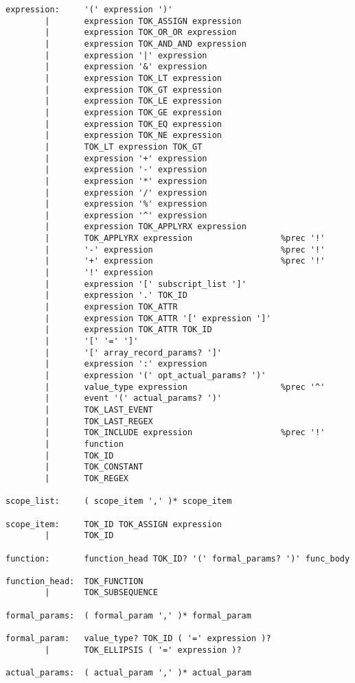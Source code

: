{{\begin{verbatim}
expression:     '(' expression ')'
        |       expression TOK_ASSIGN expression
        |       expression TOK_OR_OR expression
        |       expression TOK_AND_AND expression
        |       expression '|' expression
        |       expression '&' expression
        |       expression TOK_LT expression
        |       expression TOK_GT expression
        |       expression TOK_LE expression
        |       expression TOK_GE expression
        |       expression TOK_EQ expression
        |       expression TOK_NE expression
        |       TOK_LT expression TOK_GT
        |       expression '+' expression
        |       expression '-' expression
        |       expression '*' expression
        |       expression '/' expression
        |       expression '%' expression
        |       expression '^' expression
        |       expression TOK_APPLYRX expression
        |       TOK_APPLYRX expression                  %prec '!'
        |       '-' expression                          %prec '!'
        |       '+' expression                          %prec '!'
        |       '!' expression
        |       expression '[' subscript_list ']'
        |       expression '.' TOK_ID
        |       expression TOK_ATTR
        |       expression TOK_ATTR '[' expression ']'
        |       expression TOK_ATTR TOK_ID
        |       '[' '=' ']'
        |       '[' array_record_params? ']'
        |       expression ':' expression
        |       expression '(' opt_actual_params? ')'
        |       value_type expression                   %prec '^'
        |       event '(' actual_params? ')'
        |       TOK_LAST_EVENT
        |       TOK_LAST_REGEX
        |       TOK_INCLUDE expression                  %prec '!'
        |       function
        |       TOK_ID
        |       TOK_CONSTANT
        |       TOK_REGEX

scope_list:     ( scope_item ',' )* scope_item

scope_item:     TOK_ID TOK_ASSIGN expression
        |       TOK_ID

function:       function_head TOK_ID? '(' formal_params? ')' func_body

function_head:  TOK_FUNCTION
        |       TOK_SUBSEQUENCE

formal_params:  ( formal_param ',' )* formal_param

formal_param:   value_type? TOK_ID ( '=' expression )?
        |       TOK_ELLIPSIS ( '=' expression )?

actual_params:  ( actual_param ',' )* actual_param


\end{verbatim}}}

